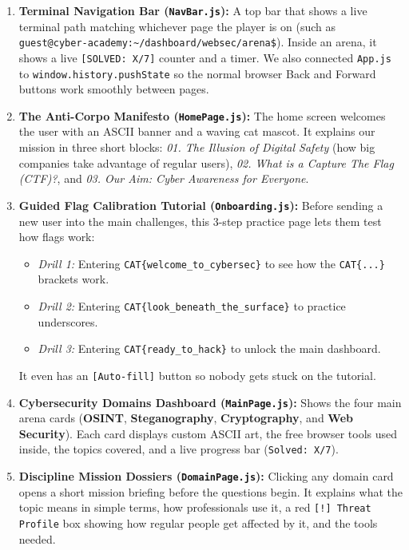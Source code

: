 \documentclass[11pt,a4paper]{article}
\begin{document}
\begin{enumerate}
    \item \textbf{Terminal Navigation Bar (\texttt{NavBar.js}):} A top bar that shows a live terminal path matching whichever page the player is on (such as \texttt{guest@cyber-academy:\allowbreak\textasciitilde/dashboard/\allowbreak websec/arena\$}). Inside an arena, it shows a live \texttt{[SOLVED: X/7]} counter and a timer. We also connected \texttt{App.js} to \texttt{window.history.pushState} so the normal browser Back and Forward buttons work smoothly between pages.
    \item \textbf{The Anti-Corpo Manifesto (\texttt{HomePage.js}):} The home screen welcomes the user with an ASCII banner and a waving cat mascot. It explains our mission in three short blocks: \textit{01. The Illusion of Digital Safety} (how big companies take advantage of regular users), \textit{02. What is a Capture The Flag (CTF)?}, and \textit{03. Our Aim: Cyber Awareness for Everyone}.
    \item \textbf{Guided Flag Calibration Tutorial (\texttt{Onboarding.js}):} Before sending a new user into the main challenges, this 3-step practice page lets them test how flags work:
    \begin{itemize}[noitemsep]
        \item \textit{Drill 1:} Entering \texttt{CAT\{welcome\_to\_cybersec\}} to see how the \texttt{CAT\{...\}} brackets work.
        \item \textit{Drill 2:} Entering \texttt{CAT\{look\_beneath\_the\_surface\}} to practice underscores.
        \item \textit{Drill 3:} Entering \texttt{CAT\{ready\_to\_hack\}} to unlock the main dashboard.
    \end{itemize}
    It even has an \texttt{[Auto-fill]} button so nobody gets stuck on the tutorial.
    \item \textbf{Cybersecurity Domains Dashboard (\texttt{MainPage.js}):} Shows the four main arena cards (\textbf{OSINT}, \textbf{Steganography}, \textbf{Cryptography}, and \textbf{Web Security}). Each card displays custom ASCII art, the free browser tools used inside, the topics covered, and a live progress bar (\texttt{Solved: X/7}).
    \item \textbf{Discipline Mission Dossiers (\texttt{DomainPage.js}):} Clicking any domain card opens a short mission briefing before the questions begin. It explains what the topic means in simple terms, how professionals use it, a red \texttt{[!] Threat Profile} box showing how regular people get affected by it, and the tools needed.

\end{enumerate}
\end{document}
